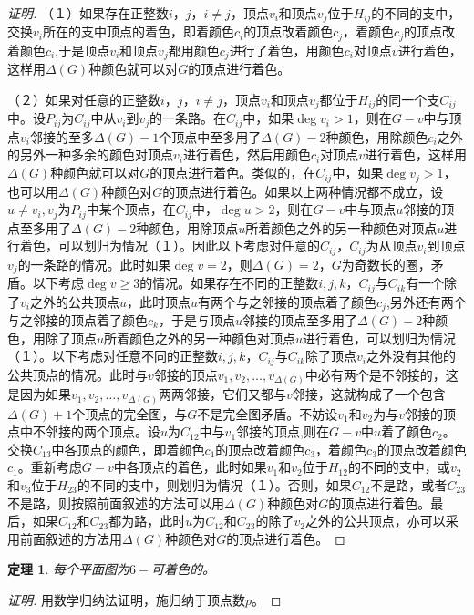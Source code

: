 \documentclass{article}
\newtheorem{Thm}{定理}
\begin{document}
\begin{CJK*}{UTF8}{gbsn}
\begin{proof}[证明]
   （１）如果存在正整数$i$，$j$，$i\neq j$，顶点$v_i$和顶点$v_j$位于$H_{ij}$的不同的支中，交换$v_i$所在的支中顶点的着色，即着颜色$c_i$的顶点改着颜色$c_j$，着颜色$c_j$的顶点改着颜色$c_i$,于是顶点$v_i$和顶点$v_j$都用颜色$c_j$进行了着色，用颜色$c_i$对顶点$v$进行着色，这样用$\Delta(G)$种颜色就可以对$G$的顶点进行着色。

   （２）如果对任意的正整数$i$，$j$，$i\neq j$，顶点$v_i$和顶点$v_j$都位于$H_{ij}$的同一个支$C_{ij}$中。设$P_{ij}$为$C_{ij}$中从$v_i$到$v_j$的一条路。在$C_{ij}$中，如果$\deg v_i>1$，则在$G-v$中与顶点$v_i$邻接的至多$\Delta(G)-1$个顶点中至多用了$\Delta(G)-2$种颜色，用除颜色$c_i$之外的另外一种多余的颜色对顶点$v_i$进行着色，然后用颜色$c_i$对顶点$v$进行着色，这样用$\Delta(G)$种颜色就可以对$G$的顶点进行着色。类似的，在$C_{ij}$中，如果$\deg v_j>1$，也可以用$\Delta(G)$种颜色对$G$的顶点进行着色。如果以上两种情况都不成立，设$u\neq v_i,v_j$为$P_{ij}$中某个顶点，在$C_{ij}$中，$\deg u>2$，则在$G-v$中与顶点$u$邻接的顶点至多用了$\Delta(G)-2$种颜色，用除顶点$u$所着颜色之外的另一种颜色对顶点$u$进行着色，可以划归为情况（１）。因此以下考虑对任意的$C_{ij}$，$C_{ij}$为从顶点$v_i$到顶点$v_j$的一条路的情况。此时如果$\deg v=2$，则$\Delta(G)=2$，$G$为奇数长的圈，矛盾。以下考虑$\deg v\geq 3$的情况。如果存在不同的正整数$i,j,k$，$C_{ij}$与$C_{ik}$有一个除了$v_i$之外的公共顶点$u$，此时顶点$u$有两个与之邻接的顶点着了颜色$c_j$,另外还有两个与之邻接的顶点着了颜色$c_k$，于是与顶点$u$邻接的顶点至多用了$\Delta(G)-2$种颜色，用除了顶点$u$所着颜色之外的另一种颜色对顶点$u$进行着色，可以划归为情况（１）。以下考虑对任意不同的正整数$i,j,k$，$C_{ij}$与$C_{ik}$除了顶点$v_i$之外没有其他的公共顶点的情况。此时与$v$邻接的顶点$v_1,v_2,\ldots,v_{\Delta(G)}$中必有两个是不邻接的，这是因为如果$v_1,v_2,\ldots,v_{\Delta(G)}$两两邻接，它们又都与$v$邻接，这就构成了一个包含$\Delta(G)+1$个顶点的完全图，与$G$不是完全图矛盾。不妨设$v_1$和$v_2$为与$v$邻接的顶点中不邻接的两个顶点。设$u$为$C_{12}$中与$v_1$邻接的顶点,则在$G-v$中$u$着了颜色$c_2$。交换$C_{13}$中各顶点的颜色，即着颜色$c_1$的顶点改着颜色$c_3$，着颜色$c_3$的顶点改着颜色$c_1$。重新考虑$G-v$中各顶点的着色，此时如果$v_1$和$v_2$位于$H_{12}$的不同的支中，或$v_2$和$v_3$位于$H_{23}$的不同的支中，则划归为情况（１）。否则，如果$C_{12}$不是路，或者$C_{23}$不是路，则按照前面叙述的方法可以用$\Delta(G)$种颜色对$G$的顶点进行着色。最后，如果$C_{12}$和$C_{23}$都为路，此时$u$为$C_{12}$和$C_{23}$的除了$v_2$之外的公共顶点，亦可以采用前面叙述的方法用$\Delta(G)$种颜色对$G$的顶点进行着色。

   
   
  \end{proof}
  \begin{Thm}
    每个平面图为$6-$可着色的。
  \end{Thm}
   \begin{proof}[证明]
   用数学归纳法证明，施归纳于顶点数$p$。


\end{proof}
\end{CJK*}
\end{document}
